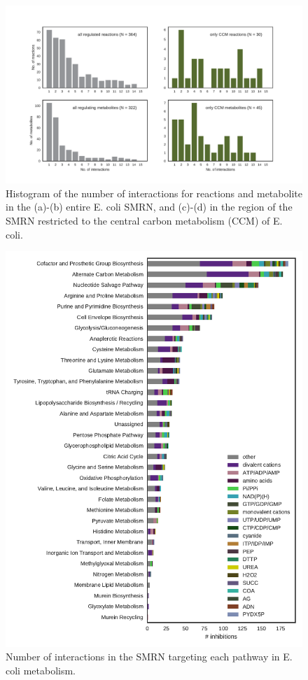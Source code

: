 \documentclass[12pt,a4paper]{article}
\begin{document}
\begin{figure}[ht!]
	\includegraphics[width=\textwidth]{../manuscript/figS2.pdf}
	\caption{Histogram of the number of interactions for reactions and metabolite in the (a)-(b) entire E. coli SMRN, and (c)-(d) in the region of the SMRN restricted to the central carbon metabolism (CCM) of E. coli. }
\end{figure}

\begin{figure}[ht!]
	\includegraphics[width=\textwidth]{../manuscript/figS3.pdf}
	\caption{Number of interactions in the SMRN targeting each pathway in E. coli metabolism. 
	}
\end{figure}
\end{document}

